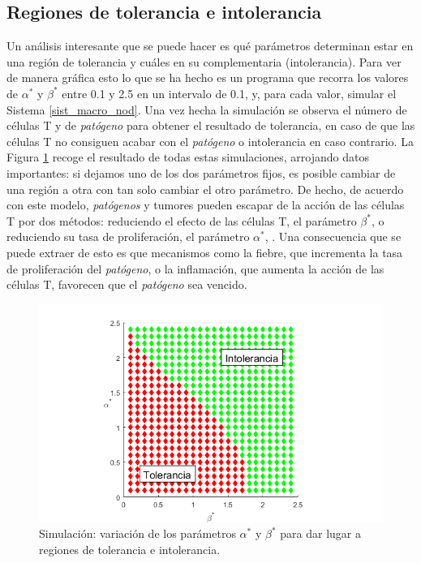 \subsection{Regiones de tolerancia e intolerancia}

Un análisis interesante que se puede hacer es qué parámetros determinan estar en una región de tolerancia y cuáles en su complementaria (intolerancia). Para ver de manera gráfica esto lo que se ha hecho es un programa que recorra los valores de $\alpha^{*}$ y $\beta^{*}$ entre 0.1 y 2.5 en un intervalo de 0.1, y, para cada valor, simular el Sistema \ref{sist_macro_nod}. Una vez hecha la simulación se observa el número de células T y de \textit{patógeno} para obtener el resultado de tolerancia, en caso de que las células T no consiguen acabar con el \textit{patógeno} o intolerancia en caso contrario. La Figura \ref{fig:macro_toler_intoler} recoge el resultado de todas estas simulaciones, arrojando datos importantes: si dejamos uno de los dos parámetros fijos, es posible cambiar de una región a otra con tan solo cambiar el otro parámetro. De hecho, de acuerdo con este modelo, \textit{patógenos} y tumores pueden escapar de la acción de las células T por dos métodos: reduciendo el efecto de las células T, el parámetro $\beta^{*}$, o reduciendo su tasa de proliferación, el parámetro $\alpha^{*}$, \citep{arias2016emergent}. Una consecuencia que se puede extraer de esto es que mecanismos como la fiebre, que incrementa la tasa de proliferación del \textit{patógeno}, o la inflamación, que aumenta la acción de las células T, favorecen que el \textit{patógeno} sea vencido. 

\begin{figure}[t]
	\centering
	\includegraphics[width=1\textwidth]{Imagenes/Simulaciones/macro_toler_intoler}
	\caption{Simulación: variación de los parámetros $\alpha^{*}$ y $\beta^{*}$ para dar lugar a regiones de tolerancia e intolerancia.}
	\label{fig:macro_toler_intoler}
\end{figure}